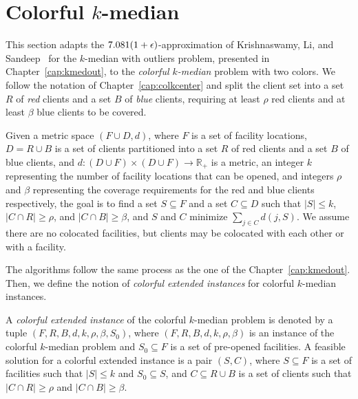 \chapter{Colorful $k$-median}
\label{cap:colkmed}

This section adapts the $7.081(1+\epsilon)$-approximation of Krishnaswamy, Li, and Sandeep~\cite{KLS2018} for the $k$-median with outliers problem, presented in Chapter~\ref{cap:kmedout}, to the \emph{colorful $k$-median} problem with two colors. We follow the notation of Chapter~\ref{cap:colkcenter} and split the client set into a set $R$ of \emph{red} clients and a set $B$ of \emph{blue} clients, requiring at least $\rho$ red clients and at least $\beta$ blue clients to be covered.

\begin{problem}
Given a metric space $(F \cup D, d)$, where $F$ is a set of facility locations, $D = R \cup B$ is a set of clients partitioned into a set $R$ of red clients and a set $B$ of blue clients, and $d : (D \cup F) \times (D \cup F) \to \mathbb{R}_+$ is a metric, an integer $k$ representing the number of facility locations that can be opened, and integers $\rho$ and $\beta$ representing the coverage requirements for the red and blue clients respectively, the goal is to find a set $S \subseteq F$ and a set $C \subseteq D$ such that $|S| \le k$, $|C \cap R| \geq \rho$, and $|C \cap B| \geq \beta$, and $S$ and $C$ minimize $\sum_{j \in C} d(j,S)$.
We assume there are no colocated facilities, but clients may be colocated with each other or with a facility.
\end{problem}

The algorithms follow the same process as the one of the Chapter~\ref{cap:kmedout}. Then, we define the notion of \emph{colorful extended instances} for colorful $k$-median instances.

\begin{definition}
A \emph{colorful extended instance} of the colorful $k$-median problem is denoted by a tuple $(F, R, B, d, k, \rho, \beta, S_0)$, where $(F,R,B,d,k,\rho,\beta)$ is an instance of the colorful $k$-median problem and $S_0 \subseteq F$ is a set of pre-opened facilities. A feasible solution for a colorful extended instance is a pair $(S,C)$, where $S \subseteq F$ is a set of facilities such that $|S| \leq k$ and $S_0 \subseteq S$, and $C \subseteq R \cup B$ is a set of clients such that $|C \cap R| \geq \rho$ and $|C \cap B| \geq \beta$.
\end{definition}

